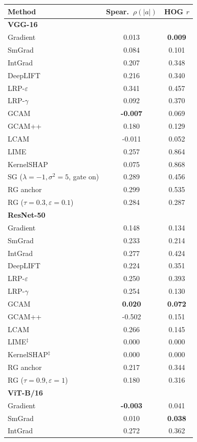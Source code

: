 \begin{tabular}{l c c}
\toprule
Method & Spear.\ $\rho(|a|)$ & HOG $r$ \\
\midrule
\multicolumn{3}{l}{\textbf{VGG-16}} \\
\midrule
Gradient & 0.013 & \textbf{0.009} \\
SmGrad & 0.084 & 0.101 \\
IntGrad & 0.207 & 0.348 \\
DeepLIFT & 0.216 & 0.340 \\
LRP-$\varepsilon$ & 0.341 & 0.457 \\
LRP-$\gamma$ & 0.092 & 0.370 \\
GCAM & \textbf{-0.007} & 0.069 \\
GCAM++ & 0.180 & 0.129 \\
LCAM & -0.011 & 0.052 \\
LIME & 0.257 & 0.864 \\
KernelSHAP & 0.075 & 0.868 \\
SG ($\lambda{=}{-}1,\sigma^2{=}5$, gate on) & 0.289 & 0.456 \\
RG anchor & 0.299 & 0.535 \\
RG ($\tau{=}0.3,\varepsilon{=}0.1$) & 0.284 & 0.287 \\
\midrule
\multicolumn{3}{l}{\textbf{ResNet-50}} \\
\midrule
Gradient & 0.148 & 0.134 \\
SmGrad & 0.233 & 0.214 \\
IntGrad & 0.277 & 0.424 \\
DeepLIFT & 0.224 & 0.351 \\
LRP-$\varepsilon$ & 0.250 & 0.393 \\
LRP-$\gamma$ & 0.254 & 0.130 \\
GCAM & \textbf{0.020} & \textbf{0.072} \\
GCAM++ & -0.502 & 0.151 \\
LCAM & 0.266 & 0.145 \\
LIME$^{\ddagger}$ & 0.000 & 0.000 \\
KernelSHAP$^{\ddagger}$ & 0.000 & 0.000 \\
RG anchor & 0.217 & 0.344 \\
RG ($\tau{=}0.9,\varepsilon{=}1$) & 0.180 & 0.316 \\
\midrule
\multicolumn{3}{l}{\textbf{ViT-B/16}} \\
\midrule
Gradient & \textbf{-0.003} & 0.041 \\
SmGrad & 0.010 & \textbf{0.038} \\
IntGrad & 0.272 & 0.362 \\

\end{tabular}
